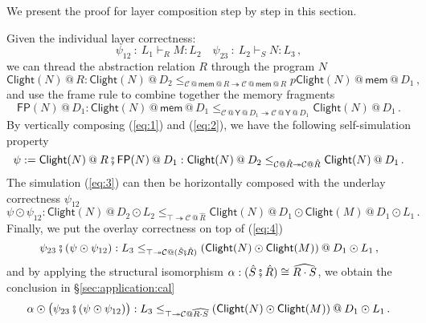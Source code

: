 \documentclass[acmsmall,screen,review,anonymous]{acmart}
\newcommand{\kw}[1]{\ensuremath{ \mathsf{#1} }}
\newcommand{\jr}{\mathsf{Y}}
\newcommand{\vcomp}{\fatsemi}
\begin{document}
We present the proof for
layer composition
step by step in this section.

Given the individual layer correctness:
\[
  \psi_{12} \: : \: L_1 \vdash_R M : L_2
  \quad
  \psi_{23} \: : \: L_2 \vdash_S N : L_3
  \,,
\]
we can thread the abstraction relation $R$
through the program $N$
\begin{equation}
  \label{eq:1}
  \kw{Clight}(N)\mathbin@ R :
  \kw{Clight}(N) \mathbin@ D_2
  \le_{\mathcal{C}\mathbin@ \kw{mem} \mathbin@ R \twoheadrightarrow \mathcal{C}\mathbin@ \kw{mem} \mathbin@ R}
p  \kw{Clight}(N) \mathbin@ \kw{mem} \mathbin@ D_1
  \,,
\end{equation}
and use the frame rule to combine together the memory fragments
\begin{equation}
  \label{eq:2}
  \kw{FP}(N)\mathbin@ D_1 :
  \kw{Clight}(N) \mathbin@ \kw{mem} \mathbin@ D_1
  \le_{\mathcal{C}\mathbin@ \jr \mathbin@ D_1 \twoheadrightarrow \mathcal{C}\mathbin@ \jr \mathbin@ D_1}
  \kw{Clight}(N) \mathbin@ D_1
  \,.
\end{equation}
By vertically composing (\ref{eq:1}) and (\ref{eq:2}), we have
the following self-simulation property
\begin{equation}
  \label{eq:3}
  \psi :=
  \kw{Clight}(N)\mathbin@ R \vcomp \kw{FP}(N)\mathbin@ D_1 :
  \kw{Clight}(N) \mathbin@ D_2
  \le_{\mathcal{C}\mathbin@ \hat{R} \twoheadrightarrow \mathcal{C}\mathbin@ \hat{R}}
  \kw{Clight}(N) \mathbin@ D_1
  \,.
\end{equation}
The simulation (\ref{eq:3}) can then be horizontally composed
with the underlay correctness $\psi_{12}$
\begin{equation}
  \label{eq:4}
  \psi \odot \psi_{12} :
  \kw{Clight}(N) \mathbin@ D_2 \odot L_2
  \le_{\top \twoheadrightarrow \mathcal{C}\mathbin@ \hat{R}}
  \kw{Clight}(N) \mathbin@ D_1 \odot \kw{Clight}(M) \mathbin@ D_1 \odot L_1
  \,.
\end{equation}
Finally, we put the overlay correctness on top of (\ref{eq:4})
\begin{equation}
  \label{eq:5}
  \psi_{23}\vcomp (\psi \odot \psi_{12}) :
  L_3
  \le_{\top \twoheadrightarrow \mathcal{C}\mathbin@ (\hat{S} \vcomp \hat{R})}
  (\kw{Clight}(N) \mathbin \odot \kw{Clight}(M)) \mathbin@ D_1 \odot L_1
  \,,
\end{equation}
and
by applying
the structural isomorphism
$\alpha : (\hat{S} \vcomp \hat{R}) \cong \widehat{R \cdot S}$,
we obtain the conclusion in \S\ref{sec:application:cal}
\[
  \alpha \odot \big(
  \psi_{23} \vcomp (\psi \odot \psi_{12}) \big) :
  L_3
  \le_{\top \twoheadrightarrow \mathcal{C}\mathbin@ \widehat{R \cdot S}}
  (\kw{Clight}(N) \mathbin \odot \kw{Clight}(M)) \mathbin@ D_1 \odot L_1
  \,.
\]
\end{document}
